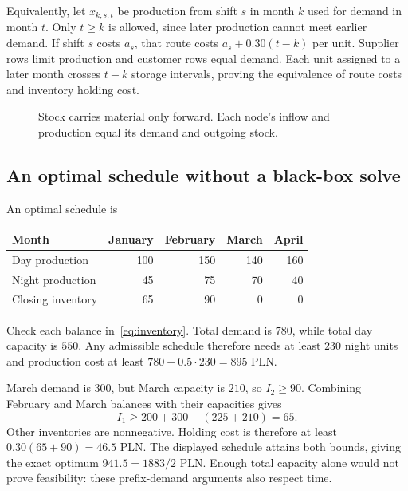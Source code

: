 \documentclass[11pt,a4paper]{article}
\begin{document}
Equivalently, let $x_{k,s,t}$ be production from shift $s$ in month $k$ used
for demand in month $t$. Only $t\geq k$ is allowed, since later production
cannot meet earlier demand. If shift $s$ costs $a_s$, that route costs
$a_s+0.30(t-k)$ per unit. Supplier rows limit production and customer rows
equal demand. Each unit assigned to a later month crosses $t-k$ storage
intervals, proving the equivalence of route costs and inventory holding cost.
\begin{figure}[H]
  \centering
  \caption{Stock carries material only forward. Each node's inflow and production
    equal its demand and outgoing stock.}\label{fig:inventory}
\end{figure}

\subsection{An optimal schedule without a black-box solve}
An optimal schedule is
\begin{center}
  \begin{tabular}{lrrrr}\toprule
    Month & January & February & March & April\\\midrule
    Day production & 100 & 150 & 140 & 160\\
    Night production & 45 & 75 & 70 & 40\\
    Closing inventory & 65 & 90 & 0 & 0\\\bottomrule
  \end{tabular}
\end{center}
Check each balance in~\eqref{eq:inventory}. Total demand is $780$, while total
day capacity is $550$. Any admissible schedule therefore needs at least $230$
night units and production cost at least $780+0.5\cdot230=895$ PLN.

March demand is $300$, but March capacity is $210$, so $I_2\geq90$.
Combining February and March balances with their capacities gives
\[
  I_1\geq200+300-(225+210)=65.
\]
Other inventories are nonnegative. Holding cost is therefore at least
$0.30(65+90)=46.5$ PLN. The displayed schedule attains both bounds, giving
the exact optimum $941.5=1883/2$ PLN. Enough total capacity alone would not
prove feasibility: these prefix-demand arguments also respect time.
\end{document}
